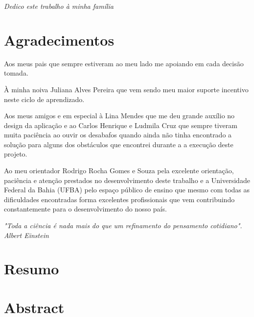 \documentclass[12pt, a4paper]{report}
\begin{document}
\newpage
\vspace*{21.9cm}
\begin{flushright}
\textit{Dedico este trabalho à minha família}
\end{flushright}


\newpage
\chapter*{Agradecimentos}
\thispagestyle{empty}
Aos meus pais que sempre estiveram ao meu lado me apoiando em cada decisão tomada.

À minha noiva Juliana Alves Pereira que vem sendo meu maior suporte incentivo neste ciclo de aprendizado. 

Aos meus amigos e em especial à Lina Mendes que me deu grande auxílio no design da aplicação e ao Carlos Henrique e Ludmila Cruz que sempre tiveram muita paciência ao ouvir os desabafos quando ainda não tinha encontrado a solução para alguns dos obstáculos que encontrei durante a a execução deste projeto. 

Ao meu orientador Rodrigo Rocha Gomes e Souza pela excelente orientação, paciência e atenção prestados no desenvolvimento deste trabalho e a Universidade Federal da Bahia (UFBA) pelo espaço público de ensino que mesmo com todas as dificuldades encontradas forma excelentes profissionais que vem contribuindo constantemente para o desenvolvimento do nosso país.  

\newpage
\vspace*{20cm}
\begin{flushright}
\begin{minipage}{8cm}
\begin{flushright}
\textit{
"Toda a ciência é nada mais do que um refinamento do pensamento cotidiano". \\
Albert Einstein}
\end{flushright}
\end{minipage}
\end{flushright}


\newpage
\chapter*{Resumo}
\thispagestyle{empty}
 

\newpage
\chapter*{Abstract}
\end{document}
